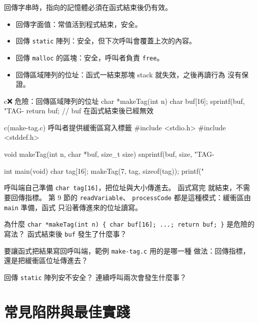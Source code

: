 回傳字串時，指向的記憶體必須在函式結束後仍有效。

\begin{itemize}
\item 回傳字面值：常值活到程式結束，安全。
\item 回傳 \texttt{static} 陣列：安全，但下次呼叫會覆蓋上次的內容。
\item 回傳 \texttt{malloc} 的區塊：安全，呼叫者負責 \texttt{free}。
\item 回傳區域陣列的位址：函式一結束那塊 stack 就失效，之後再讀行為
      沒有保證。
\end{itemize}

\begin{code}{c}{❌ 危險：回傳區域陣列的位址}
char *makeTag(int n) {
    char buf[16];
    sprintf(buf, "TAG-%
    return buf;   // buf 在函式結束後已經無效
}
\end{code}

\begin{example}{c}{(make-tag.c) 呼叫者提供緩衝區寫入標籤}
#include <stdio.h>
#include <stddef.h>

void makeTag(int n, char *buf, size_t size) {
    snprintf(buf, size, "TAG-%
}

int main(void) {
    char tag[16];
    makeTag(7, tag, sizeof(tag));
    printf("%
}
\end{example}


呼叫端自己準備 \texttt{char tag[16]}，把位址與大小傳進去。 函式寫完
就結束，不需要回傳指標。 第 9 節的 \texttt{readVariable}、
\texttt{processCode} 都是這種模式：緩衝區由 \texttt{main} 準備，函式
只沿著傳進來的位址讀寫。


\begin{drills}[label=drills:str-pass-return]
\item 為什麼 \texttt{char *makeTag(int n) \{ char buf[16]; ...; return
buf; \}} 是危險的寫法？ 函式結束後 \texttt{buf} 發生了什麼事？
\item 要讓函式把結果寫回呼叫端，範例 \texttt{make-tag.c} 用的是哪一種
做法：回傳指標，還是把緩衝區位址傳進去？
\item 回傳 \texttt{static} 陣列安不安全？ 連續呼叫兩次會發生什麼事？
\end{drills}

\section{常見陷阱與最佳實踐}
\label{sec:str-pitfalls}


